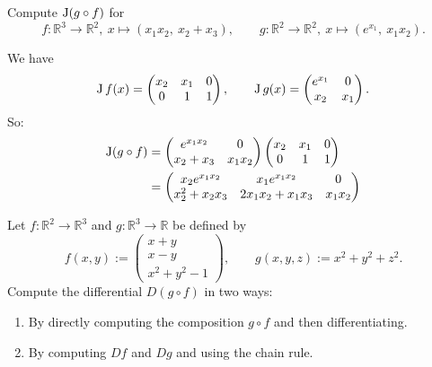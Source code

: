\begin{exercise}
\label{ex:chain_rule_computation}
Compute $\operatorname{J}(g\circ f)$ for
\[f : \mathbb{R}^3\to\mathbb{R}^2,\ x \mapsto (x_1x_2,\ x_2+x_3), \qquad g : \mathbb{R}^2\to\mathbb{R}^2,\ x \mapsto (e^{x_1},\ x_1x_2).\]
\end{exercise}

\begin{exercisesolution}
We have
\[\operatorname{J} f(x) = \begin{pmatrix} x_2 & x_1 & 0 \\ 0 & 1 & 1\end{pmatrix}, \qquad \operatorname{J} g(x) = \begin{pmatrix} e^{x_1} & 0 \\ x_2 & x_1 \end{pmatrix}.\]
So:
\[
\begin{aligned}
\operatorname{J}(g\circ f) &= \begin{pmatrix} e^{x_1x_2} & 0 \\ x_2+x_3 & x_1x_2\end{pmatrix}\begin{pmatrix} x_2 & x_1 & 0 \\ 0 & 1 & 1\end{pmatrix} \\
&= \begin{pmatrix} x_2e^{x_1x_2} & x_1e^{x_1x_2} & 0 \\ x_2^2 + x_2x_3 & 2x_1x_2 + x_1x_3 & x_1x_2 \end{pmatrix}
\end{aligned}
\]
\end{exercisesolution}

\begin{exercise}
\label{ex:chain_rule_computation_paschoud}
Let $f: \mathbb{R}^2 \to \mathbb{R}^3$ and $g: \mathbb{R}^3 \to \mathbb{R}$ be defined by
\[f(x,y) := \begin{pmatrix} x+y \\ x-y \\ x^2+y^2-1 \end{pmatrix}, \qquad g(x,y,z) := x^2+y^2+z^2.\]
Compute the differential $D(g \circ f)$ in two ways:
\begin{enumerate}[label=\textbf{(\alph*)}]
  \item By directly computing the composition $g \circ f$ and then differentiating.
  \item By computing $Df$ and $Dg$ and using the chain rule.
\end{enumerate}
\end{exercise}

